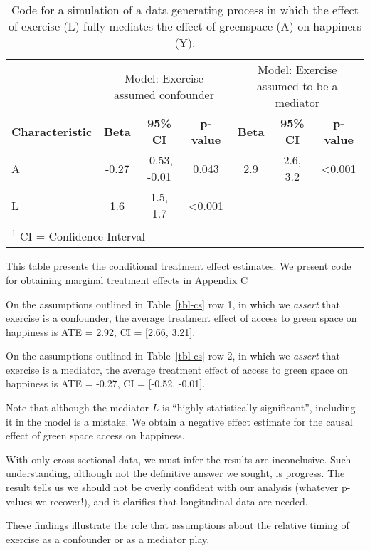 \documentclass[
  single column]{article}
\begin{document}
\begin{table}
\caption{Code for a simulation of a data generating process in which the effect
of exercise (L) fully mediates the effect of greenspace (A) on happiness
(Y).}\tabularnewline

\centering
\begin{tabular}{lcccccc}
\toprule
\multicolumn{1}{c}{ } & \multicolumn{3}{c}{Model: Exercise assumed confounder} & \multicolumn{3}{c}{Model: Exercise assumed to be a mediator} \\
\cmidrule(l{3pt}r{3pt}){2-4} \cmidrule(l{3pt}r{3pt}){5-7}
\textbf{Characteristic} & \textbf{Beta} & \textbf{95\% CI} & \textbf{p-value} & \textbf{Beta} & \textbf{95\% CI} & \textbf{p-value}\\
\midrule
A & -0.27 & -0.53, -0.01 & 0.043 & 2.9 & 2.6, 3.2 & <0.001\\
L & 1.6 & 1.5, 1.7 & <0.001 &  &  & \\
\bottomrule
\multicolumn{7}{l}{\rule{0pt}{1em}\textsuperscript{1} CI = Confidence Interval}\\
\end{tabular}
\end{table}

This table presents the conditional treatment effect estimates. We
present code for obtaining marginal treatment effects in
\hyperref[appendix-c]{Appendix C}

On the assumptions outlined in Table~\ref{tbl-cs} row 1, in which we
\emph{assert} that exercise is a confounder, the average treatment
effect of access to green space on happiness is ATE = 2.92, CI =
{[}2.66, 3.21{]}.

On the assumptions outlined in Table~\ref{tbl-cs} row 2, in which we
\emph{assert} that exercise is a mediator, the average treatment effect
of access to green space on happiness is ATE = -0.27, CI = {[}-0.52,
-0.01{]}.

Note that although the mediator \(L\) is ``highly statistically
significant'', including it in the model is a mistake. We obtain a
negative effect estimate for the causal effect of green space access on
happiness.

With only cross-sectional data, we must infer the results are
inconclusive. Such understanding, although not the definitive answer we
sought, is progress. The result tells us we should not be overly
confident with our analysis (whatever p-values we recover!), and it
clarifies that longitudinal data are needed.

These findings illustrate the role that assumptions about the relative
timing of exercise as a confounder or as a mediator play.
\end{document}
